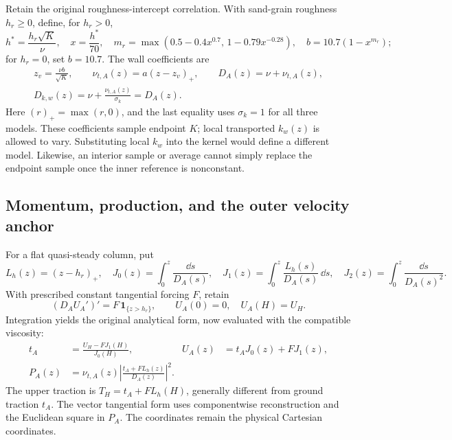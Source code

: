 Retain the original roughness-intercept correlation. With sand-grain
roughness \(h_r\ge0\), define, for \(h_r>0\),
\begin{equation}
 h^*=\frac{h_r\sqrt K}{\nu},\quad x=\frac{h^*}{70},\quad
 m_r=\max(0.5-0.4x^{0.7},\,1-0.79x^{-0.28}),\quad
 b=10.7(1-x^{m_r});
 \label{mawf:roughness}
\end{equation}
for \(h_r=0\), set \(b=10.7\). The wall coefficients are
\begin{equation}
 \begin{gathered}
 z_v=\frac{\nu b}{\sqrt K},\qquad
 \nu_{t,A}(z)=a(z-z_v)_+,\qquad D_A(z)=\nu+\nu_{t,A}(z),\\
 D_{k,w}(z)=\nu+\frac{\nu_{t,A}(z)}{\sigma_k}=D_A(z).
 \end{gathered}
 \label{mawf:viscosity}
\end{equation}
Here \((r)_+=\max(r,0)\), and the last equality uses \(\sigma_k=1\)
for all three models. These coefficients sample endpoint \(K\);
local transported \(k_w(z)\) is allowed to vary. Substituting local
\(k_w\) into the kernel would define a different model. Likewise,
an interior sample or average cannot simply replace the endpoint
sample once the inner reference is nonconstant.

\subsection{Momentum, production, and the outer velocity anchor}
\label{mawf:momentum}
For a flat quasi-steady column, put
\begin{equation}
 L_h(z)=(z-h_r)_+,\quad
 J_0(z)=\int_0^z\frac{\dd s}{D_A(s)},\quad
 J_1(z)=\int_0^z\frac{L_h(s)}{D_A(s)}\,\dd s,\quad
 J_2(z)=\int_0^z\frac{\dd s}{D_A(s)^2}.
 \label{mawf:J}
\end{equation}
With prescribed constant tangential forcing \(F\), retain
\begin{equation}
 (D_AU_A')'=F\,\mathbf1_{\{z>h_r\}},\qquad
 U_A(0)=0,\quad U_A(H)=U_H.
 \label{mawf:momentum-bvp}
\end{equation}
Integration yields the original analytical form, now evaluated
with the compatible viscosity:
\begin{equation}
 \boxed{\begin{aligned}
 t_A&=\frac{U_H-FJ_1(H)}{J_0(H)},&
 U_A(z)&=t_AJ_0(z)+FJ_1(z),\\
 P_A(z)&=\nu_{t,A}(z)
       \left|\frac{t_A+FL_h(z)}{D_A(z)}\right|^2 .
 \end{aligned}}
 \label{mawf:forced}
\end{equation}
The upper traction is \(T_H=t_A+FL_h(H)\), generally different
from ground traction \(t_A\). The vector tangential form uses
componentwise reconstruction and the Euclidean square in \(P_A\).
The coordinates remain the physical Cartesian coordinates.

